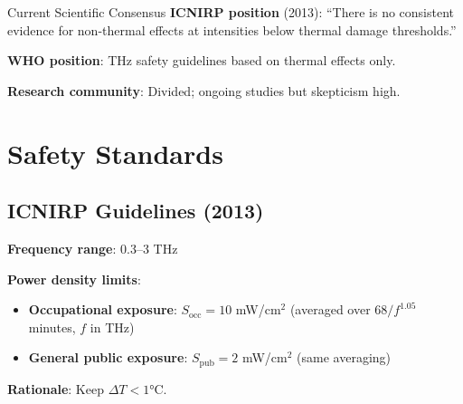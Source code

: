 \begin{calloutbox}{Current Scientific Consensus}
\textbf{ICNIRP position} (2013): ``There is no consistent evidence for non-thermal effects at intensities below thermal damage thresholds.''

\textbf{WHO position}: THz safety guidelines based on thermal effects only.

\textbf{Research community}: Divided; ongoing studies but skepticism high.
\end{calloutbox}

\section{Safety Standards}

\subsection{ICNIRP Guidelines (2013)}

\textbf{Frequency range}: 0.3--3 THz

\textbf{Power density limits}:
\begin{itemize}
\item \textbf{Occupational exposure}: $S_{\text{occ}} = 10$ mW/cm$^2$ (averaged over $68/f^{1.05}$ minutes, $f$ in THz)
\item \textbf{General public exposure}: $S_{\text{pub}} = 2$ mW/cm$^2$ (same averaging)
\end{itemize}

\textbf{Rationale}: Keep $\Delta T < 1°$C.

